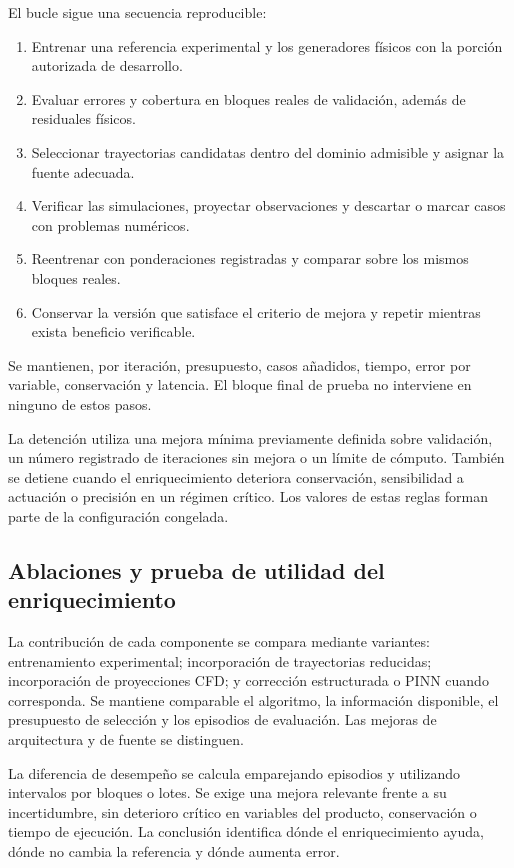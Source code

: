 El bucle sigue una secuencia reproducible:
\begin{enumerate}
\item Entrenar una referencia experimental y los generadores físicos con la porción autorizada de desarrollo.
\item Evaluar errores y cobertura en bloques reales de validación, además de residuales físicos.
\item Seleccionar trayectorias candidatas dentro del dominio admisible y asignar la fuente adecuada.
\item Verificar las simulaciones, proyectar observaciones y descartar o marcar casos con problemas numéricos.
\item Reentrenar con ponderaciones registradas y comparar sobre los mismos bloques reales.
\item Conservar la versión que satisface el criterio de mejora y repetir mientras exista beneficio verificable.
\end{enumerate}
Se mantienen, por iteración, presupuesto, casos añadidos, tiempo, error por variable, conservación y latencia. El bloque final de prueba no interviene en ninguno de estos pasos.

La detención utiliza una mejora mínima previamente definida sobre validación, un número registrado de iteraciones sin mejora o un límite de cómputo. También se detiene cuando el enriquecimiento deteriora conservación, sensibilidad a actuación o precisión en un régimen crítico. Los valores de estas reglas forman parte de la configuración congelada.

\subsection{Ablaciones y prueba de utilidad del enriquecimiento}

La contribución de cada componente se compara mediante variantes: entrenamiento experimental; incorporación de trayectorias reducidas; incorporación de proyecciones CFD; y corrección estructurada o PINN cuando corresponda. Se mantiene comparable el algoritmo, la información disponible, el presupuesto de selección y los episodios de evaluación. Las mejoras de arquitectura y de fuente se distinguen.

La diferencia de desempeño se calcula emparejando episodios y utilizando intervalos por bloques o lotes. Se exige una mejora relevante frente a su incertidumbre, sin deterioro crítico en variables del producto, conservación o tiempo de ejecución. La conclusión identifica dónde el enriquecimiento ayuda, dónde no cambia la referencia y dónde aumenta error.

